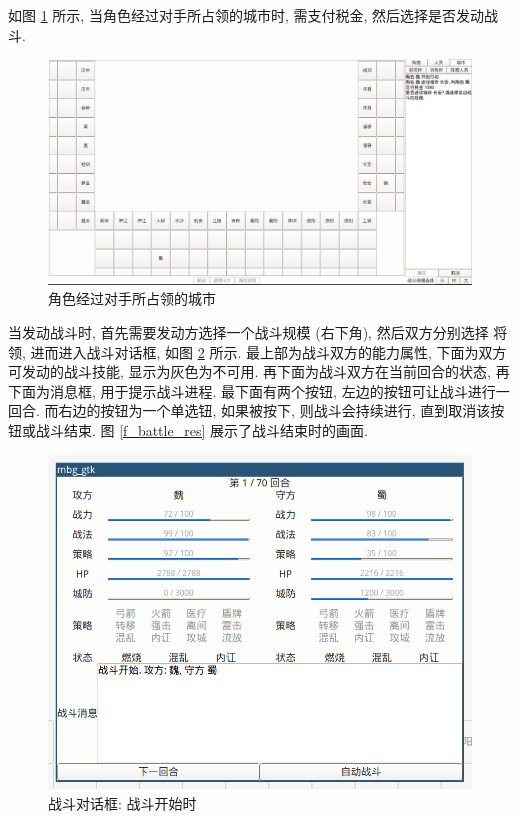 \documentclass[UTF8, zihao=-4]{ctexart} %
\begin{document}
如图 \ref{f_cross_city} 所示, 当角色经过对手所占领的城市时, 需支付税金,
然后选择是否发动战斗. 
\begin{figure}
    \centering
    \includegraphics[width=\textwidth]{f_cross_city.png}
    \caption{\label{f_cross_city}角色经过对手所占领的城市}
\end{figure}
当发动战斗时, 首先需要发动方选择一个战斗规模 (右下角), 然后双方分别选择
将领, 进而进入战斗对话框, 如图 \ref{f_battle} 所示.
最上部为战斗双方的能力属性, 下面为双方可发动的战斗技能, 显示为灰色为不可用.
再下面为战斗双方在当前回合的状态, 再下面为消息框, 用于提示战斗进程.
最下面有两个按钮, 左边的按钮可让战斗进行一回合. 而右边的按钮为一个单选钮, 
如果被按下, 则战斗会持续进行, 直到取消该按钮或战斗结束. 图 \ref{f_battle_res}
展示了战斗结束时的画面.
\begin{figure}
    \centering
    \includegraphics[scale=0.4]{f_battle.png}
    \caption{\label{f_battle}战斗对话框: 战斗开始时}
\end{figure}
\end{document}
